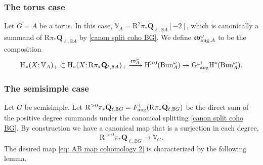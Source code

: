 \documentclass[reqno]{amsart}
\numberwithin{equation}{subsection}
\theoremstyle{definition}
\def\BB{\mathbb{B}}
\def\VV{\mathbb{V}}
\newcommand{\Bun}{\textup{Bun}}
\newcommand{\Gr}{\textup{Gr}}
\newcommand{\surj}{\twoheadrightarrow}
\newcommand\xr{\xrightarrow}
\newcommand{\om}{\omega}
\newcommand\aug{\textup{aug}}
\newcommand\frev{\mathfrak{ev}}
\newcommand{\Q}{\mathbf{Q}}
\newcommand{\Qll}[1]{\Q_{\ell, #1}}
\newcommand{\rH}{\ensuremath{\mathrm{H}}\xspace}
\newcommand{\rR}{\ensuremath{\mathrm{R}}\xspace}
\begin{document}
\subsubsection{The torus case} Let $G=A$ be a torus. In this case, $\VV_{A}=\rR^{2}\pi_* \Qll{\BB A}[-2]$, which is canonically a summand of $\rR\pi_* \Qll{\BB A}$ by \eqref{canon split coho BG}. We define $\frev^{\om}_{\aug, A}$ to be the composition
\begin{equation*}
\rH_*(X; \VV_{A})_{+}\subset \rH_*(X; \rR \pi_* \Qll{\BB A})_{+}\xr{\frev^{\om}_{A}} \rH^{>0}(\Bun_A^\omega)\surj \Gr^{1}_{\aug}\rH^{*}(\Bun_A^\omega).
\end{equation*}

\subsubsection{The semisimple case} Let $G$ be semisimple. Let $\rR^{>0} \pi_* \Qll{\BB G}=F^{1}_{\aug}(\rR\pi_* \Qll{\BB G})$ be the direct sum of the positive degree summands under the canonical splitting \eqref{canon split coho BG}. By construction we have a canonical map that is a surjection in each degree,
\begin{equation*}
\rR^{>0} \pi_* \Qll{\BB G}\to \VV_{G}.
\end{equation*}
The desired map \eqref{eq: AB map cohomology 2} is characterized by the following lemma.
\end{document}
